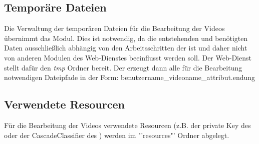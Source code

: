 \subsection{Temporäre Dateien}
Die Verwaltung der temporären Dateien für die Bearbeitung der Videos übernimmt das  Modul. Dies ist notwendig, da die entstehenden und benötigten Daten ausschließlich abhängig von den Arbeitsschritten der  ist und daher nicht von anderen Modulen des Web-Dienstes beeinflusst werden soll. Der Web-Dienst stellt dafür den \textit{tmp} Ordner bereit.\newline
Der  erzeugt dann alle für die Bearbeitung notwendigen Dateipfade in der Form:\newline
benutzername\_videoname\_attribut.endung

\subsection{Verwendete Resourcen}
Für die Bearbeitung der Videos verwendete Resourcen (z.B. der private Key des  oder der CascadeClassifier des ) werden im "'resources"' Ordner abgelegt.
